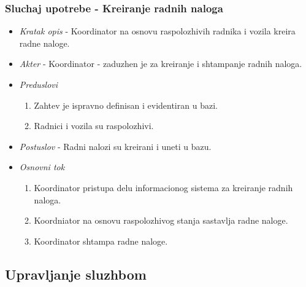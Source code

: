 \documentclass[10 pt]{article}
\begin{document}
	\subsubsection{Sluchaj upotrebe - Kreiranje radnih naloga}
	
		\begin{itemize}
		
			\item\textit{Kratak opis} - Koordinator na osnovu raspolozhivih radnika i vozila kreira radne naloge.
			
			\item\textit{Akter} - Koordinator - zaduzhen je za kreiranje i shtampanje radnih naloga.
			
			\item\textit{Preduslovi}
				\begin{enumerate}
					\item Zahtev je ispravno definisan i evidentiran u bazi.
					\item Radnici i vozila su raspolozhivi.
				\end{enumerate}
			
			\item\textit{Postuslov} - Radni nalozi su kreirani i uneti u bazu.
			
			\item\textit{Osnovni tok}
				\begin{enumerate}
					\item Koordinator pristupa delu informacionog sistema za kreiranje radnih naloga.
					\item Koordniator na osnovu raspolozhivog stanja sastavlja radne naloge.
					\item Koordinator shtampa radne naloge.

				\end{enumerate}
				
		\end{itemize}
		


	\subsection{Upravljanje sluzhbom}
	
\end{document}
